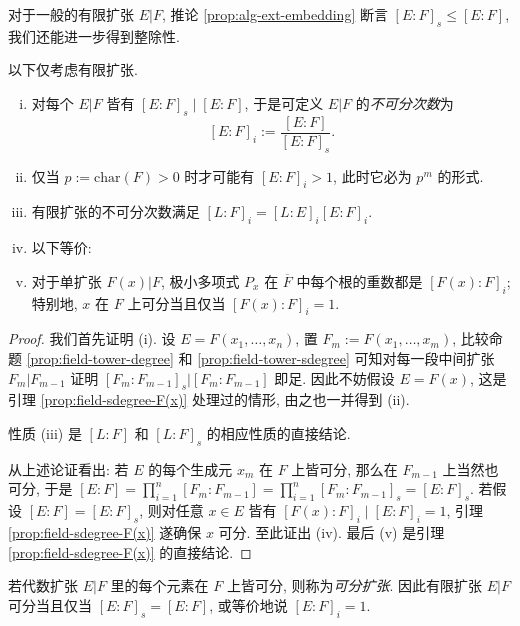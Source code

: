 对于一般的有限扩张 $E|F$, 推论 \ref{prop:alg-ext-embedding} 断言 $[E:F]_s \leq [E:F]$, 我们还能进一步得到整除性.
\begin{definition-theorem}\label{def:insep-deg}
	以下仅考虑有限扩张.
	\begin{enumerate}[(i)]
		\item 对每个 $E|F$ 皆有 $[E:F]_s \mid [E:F]$, 于是可定义 $E|F$ 的\emph{不可分次数}为 
			\[ [E:F]_i := \frac{[E:F]}{[E:F]_s}. \]
		\item 仅当 $p := \text{char}(F) > 0$ 时才可能有 $[E:F]_i > 1$, 此时它必为 $p^m$ 的形式.
		\item 有限扩张的不可分次数满足 $[L:F]_i = [L:E]_i [E:F]_i$.
		\item 以下等价:
		\item 对于单扩张 $F(x)|F$, 极小多项式 $P_x$ 在 $\overline{F}$ 中每个根的重数都是 $[F(x):F]_i$; 特别地, $x$ 在 $F$ 上可分当且仅当 $[F(x):F]_i = 1$.
	\end{enumerate}
\end{definition-theorem}
\begin{proof}
	我们首先证明 (i). 设 $E = F(x_1, \ldots, x_n)$, 置 $F_m := F(x_1, \ldots, x_m)$, 比较命题 \ref{prop:field-tower-degree} 和 \ref{prop:field-tower-sdegree} 可知对每一段中间扩张 $F_m|F_{m-1}$ 证明 $[F_m:F_{m-1}]_s | [F_m:F_{m-1}]$ 即足. 因此不妨假设 $E = F(x)$, 这是引理 \ref{prop:field-sdegree-F(x)} 处理过的情形, 由之也一并得到 (ii).
	
	性质 (iii) 是 $[L:F]$ 和 $[L:F]_s$ 的相应性质的直接结论.

	从上述论证看出: 若 $E$ 的每个生成元 $x_m$ 在 $F$ 上皆可分, 那么在 $F_{m-1}$ 上当然也可分, 于是 $[E:F] = \prod_{i=1}^n [F_m : F_{m-1}] = \prod_{i=1}^n [F_m : F_{m-1}]_s = [E:F]_s$. 若假设 $[E:F]=[E:F]_s$, 则对任意 $x \in E$ 皆有 $[F(x):F]_i \mid [E:F]_i = 1$, 引理 \ref{prop:field-sdegree-F(x)} 遂确保 $x$ 可分. 至此证出 (iv). 最后 (v) 是引理 \ref{prop:field-sdegree-F(x)} 的直接结论.
\end{proof}

\begin{definition}
	若代数扩张 $E|F$ 里的每个元素在 $F$ 上皆可分, 则称为\emph{可分扩张}. 因此有限扩张 $E|F$ 可分当且仅当 $[E:F]_s = [E:F]$, 或等价地说 $[E:F]_i = 1$.
\end{definition}

